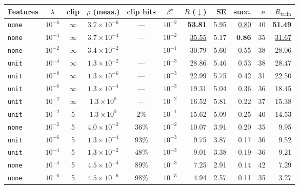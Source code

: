 \begin{tabular}{@{}l c c c c c r r r r r@{}}
\toprule
\textbf{Features} & \textbf{$\lambda$} & \textbf{clip} & \textbf{$\rho$ (meas.)} & \textbf{clip hits} & \textbf{$\beta^\star$} & \textbf{$\bar{R}$ ($\downarrow$)} & \textbf{SE} & \textbf{succ.} & \textbf{$n$} & \textbf{$\bar{R}_{\text{train}}$} \\
\midrule
\texttt{none} & $10^{-6}$ & $\infty$ & $3.7\times10^{-6}$ & --- & $10^{-2}$ & \textbf{53.81} & 5.95 & \underline{0.80} & 40 & \textbf{51.49} \\
\texttt{none} & $10^{-4}$ & $\infty$ & $3.7\times10^{-4}$ & --- & $10^{-2}$ & \underline{35.55} & 5.17 & \textbf{0.86} & 35 & \underline{31.67} \\
\texttt{none} & $10^{-2}$ & $\infty$ & $3.4\times10^{-2}$ & --- & $10^{-1}$ & 30.79 & 5.60 & 0.55 & 38 & 28.06 \\
\texttt{unit} & $10^{-4}$ & $\infty$ & $1.3\times10^{-2}$ & --- & $10^{-3}$ & 28.86 & 5.46 & 0.53 & 38 & 28.47 \\
\texttt{unit} & $10^{-8}$ & $\infty$ & $1.3\times10^{-6}$ & --- & $10^{-3}$ & 22.99 & 5.75 & 0.42 & 31 & 22.50 \\
\texttt{unit} & $10^{-6}$ & $\infty$ & $1.3\times10^{-4}$ & --- & $10^{-3}$ & 19.31 & 5.04 & 0.36 & 36 & 18.45 \\
\texttt{unit} & $10^{-2}$ & $\infty$ & $1.3\times10^{0}$ & --- & $10^{-2}$ & 16.52 & 5.81 & 0.22 & 37 & 15.38 \\
\texttt{unit} & $10^{-2}$ & 5 & $1.3\times10^{0}$ & 2\% & $10^{-1}$ & 15.62 & 5.09 & 0.25 & 40 & 14.53 \\
\texttt{none} & $10^{-2}$ & 5 & $4.0\times10^{-2}$ & 36\% & $10^{-2}$ & 10.07 & 3.91 & 0.20 & 35 & 9.95 \\
\texttt{unit} & $10^{-6}$ & 5 & $1.3\times10^{-4}$ & 93\% & $10^{-3}$ & 9.75 & 3.87 & 0.17 & 36 & 9.52 \\
\texttt{unit} & $10^{-4}$ & 5 & $1.3\times10^{-2}$ & 48\% & $10^{-3}$ & 9.01 & 3.38 & 0.19 & 36 & 9.21 \\
\texttt{none} & $10^{-4}$ & 5 & $4.5\times10^{-4}$ & 89\% & $10^{-3}$ & 7.25 & 2.91 & 0.14 & 42 & 7.29 \\
\texttt{none} & $10^{-6}$ & 5 & $4.5\times10^{-6}$ & 98\% & $10^{-3}$ & 4.94 & 2.57 & 0.11 & 35 & 3.27 \\
\bottomrule
\end{tabular}

